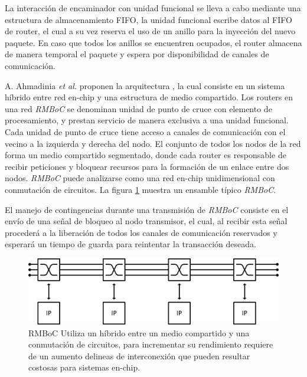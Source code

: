 La interacción de encaminador con unidad funcional se lleva a cabo mediante una estructura de almacenamiento FIFO, la unidad funcional escribe datos al FIFO de router, el cual a su vez reserva el uso de un anillo para la inyección del nuevo paquete. En caso que todos los anillos se encuentren ocupados, el router almacena de manera temporal el paquete y espera por disponibilidad de canales de comunicación.

A. Ahmadinia \textit{et al.} proponen la arquitectura \cite{chapter3:1509437, chapter3:1511976}, la cual consiste en un sistema híbrido entre red en-chip y una estructura de medio compartido. Los routers en una red \textit{RMBoC} se denominan unidad de punto de cruce con elemento de procesamiento, y prestan servicio de manera exclusiva a una unidad funcional. Cada unidad de punto de cruce tiene acceso a canales de comunicación con el vecino a la izquierda y derecha del nodo. El conjunto de todos los nodos de la red forma un medio compartido segmentado\cite{chapter3:Romine:1992:DSM:143487}, donde cada router es responsable de recibir peticiones y bloquear recursos para la formación de un enlace entre dos nodos. \textit{RMBoC} puede analizarse como una red en-chip unidimensional con conmutación de circuitos. La figura \ref{fig:ch3_rmboc} muestra un ensamble típico \textit{RMBoC}.

El manejo de contingencias durante una transmisión de \textit{RMBoC} consiste en el envío de una señal de bloqueo al nodo transmisor, el cual, al recibir esta señal procederá a la liberación de todos los canales de comunicación reservados y esperará un tiempo de guarda para reintentar la transacción deseada.

\begin{figure}
	\begin{center}
		\includegraphics[scale=0.6]{figures/ch3_rmboc.png}
	\end{center}
	\caption
		{	
			RMBoC Utiliza un híbrido entre un medio compartido y una conmutación de circuitos, para incrementar su rendimiento requiere de un aumento delineas de interconexión que pueden resultar costosas para sistemas en-chip.
		}
	\label{fig:ch3_rmboc}
\end{figure}

